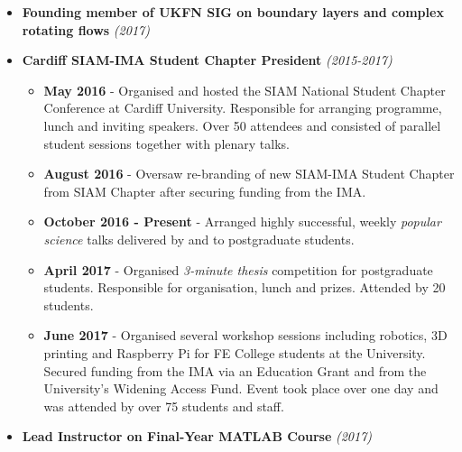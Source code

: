 \documentclass[11pt,a4paper,sans]{moderncv}        %
\begin{document}
\begin{itemize}

\item{\textbf{Founding member of UKFN SIG on boundary layers and complex rotating flows} \textit{(2017)}

\vspace{6pt}

}

\item{\textbf{Cardiff SIAM-IMA Student Chapter President} \textit{(2015-2017)}

\vspace{6pt}

\small{
\begin{itemize}
	\item \textbf{May 2016} - Organised and hosted the SIAM National Student Chapter Conference at Cardiff University. Responsible for arranging programme, lunch and inviting speakers. Over 50 attendees and consisted of parallel student sessions together with plenary talks.
	\vspace{6pt}
	\item \textbf{August 2016} - Oversaw re-branding of new SIAM-IMA Student Chapter from SIAM Chapter after securing funding from the IMA.
	\vspace{6pt}
	\item \textbf{October 2016 - Present} - Arranged highly successful, weekly \textit{popular science} talks delivered by and to postgraduate students.
	\vspace{6pt}
	\item \textbf{April 2017} - Organised \textit{3-minute thesis} competition for postgraduate students. Responsible for organisation, lunch and prizes. Attended by 20 students.
	\vspace{6pt}
	\item \textbf{June 2017} - Organised several workshop sessions including robotics, 3D printing and Raspberry Pi for FE College students at the University. Secured funding from the IMA via an Education Grant and from the University's Widening Access Fund. Event took place over one day and was attended by over 75 students and staff.
\end{itemize}
}}

\vspace{6pt}

\item{\textbf{Lead Instructor on Final-Year MATLAB Course} \textit{(2017)}

\vspace{6pt}

}
\end{itemize}
\end{document}
